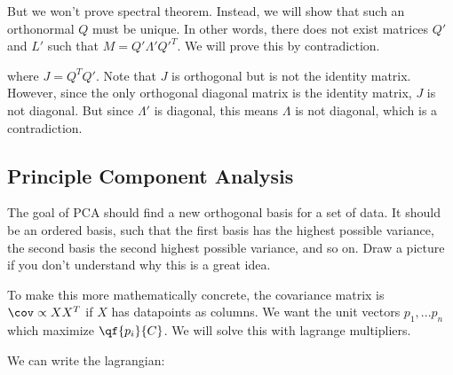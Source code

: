 \documentclass[12pt]{article}
\begin{document}
But we won't prove spectral theorem. Instead, we will show that such an orthonormal $Q$ must be unique. In other words, there does not exist matrices $Q'$ and $L'$ such that $M = Q' \Lambda' Q'^T$. We will prove this by contradiction. 


where $J = Q^TQ'$. Note that $J$ is orthogonal but is not the identity matrix. However, since the only orthogonal diagonal matrix is the identity matrix, $J$ is not diagonal. But since $\Lambda'$ is diagonal, this means $\Lambda$ is not diagonal, which is a contradiction.


\subsection{Principle Component Analysis}

The goal of PCA should find a new orthogonal basis for a set of data. It should be an ordered basis, such that the first basis has the highest possible variance, the second basis the second highest possible variance, and so on. Draw a picture if you don't understand why this is a great idea. 

To make this more mathematically concrete, the covariance matrix is $\cov \propto XX^T$ if $X$ has datapoints as columns. We want the unit vectors $p_1, ... p_n$ which maximize $\qf{p_i}{C}$. We will solve this with lagrange multipliers.


We can write the lagrangian:


\end{document}
